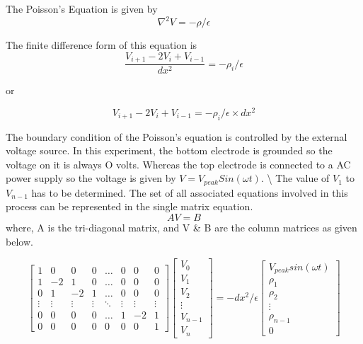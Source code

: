 \documentclass[11pt]{article}
\begin{document}
The Poisson's Equation is given by \[\nabla^2V=-\rho/ \epsilon\]

The finite difference form of this equation is
\[    \frac{V_{i+1}-2V_i+V_{i-1}}{dx^2}=-\rho_i/ \epsilon\]

or

\[   {V_{i+1}-2 V_{i} +V_{i-1}}=-\rho_i/ \epsilon \times {dx^2}\]

The boundary condition of the Poisson's equation is controlled by the
external voltage source. In this experiment, the bottom electrode is
grounded so the voltage on it is always O volts. Whereas the top
electrode is connected to a AC power supply so the voltage is given by
\(V=V_{peak} Sin (\omega t)\). \textbackslash{} The value of \(V_1\) to
\(V_{n-1}\) has to be determined. The set of all associated equations
involved in this process can be represented in the single matrix
equation. \[AV=B\] where, A is the tri-diagonal matrix, and V \& B are
the column matrices as given below.

    \begin{equation}
\begin{bmatrix}
    1       & 0 & 0 & 0& \dots & 0&0&0 \\
    1       & -2 & 1 &0 & \dots & 0 &0 &0\\
    0       &  1 & -2 & 1 & \dots & 0&0&0 \\
    \vdots & \vdots & \vdots&\vdots & \ddots & \vdots & \vdots & \vdots \\
    0       &  0 & 0 & 0 & \dots & 1 &-2 &1\\
    0&0&0&0&0&0&0&1
\end{bmatrix}
\begin{bmatrix}
    V_0 \\
    V_1\\
    V_2\\
    \vdots\\
    V_{n-1}\\
    V_n
\end{bmatrix}
=
-dx^2/\epsilon
\begin{bmatrix}
    V_{peak}sin(\omega t) \\
    \rho_1\\
    \rho_2\\
    \vdots\\
    \rho_{n-1}\\
    0
\end{bmatrix}
\end{equation}
\end{document}
